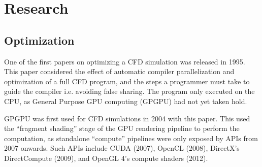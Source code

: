 
\chapter{Research}
\label{sec:Research} 






\section{Optimization}
One of the first papers on optimizing a CFD simulation was released in 1995\cite{paper:1995CfdOpt:1383209}.
This paper considered the effect of automatic compiler parallelization and optimization of a full CFD program, and the steps a programmer must take to guide the compiler i.e. avoiding false sharing.
The program only executed on the CPU, as General Purpose GPU computing (GPGPU) had not yet taken hold.

GPGPU was first used for CFD simulations in 2004 with this paper\cite{paper:2004CfdGPU:10.1109/SC.2004.26}.
This used the ``fragment shading'' stage of the GPU rendering pipeline to perform the computation, as standalone ``compute'' pipelines were only exposed by APIs from 2007 onwards.
Such APIs include CUDA (2007)\cite{tool:CUDAProgrammingV1}, OpenCL (2008)\cite{tool:OpenCL1.0PressRelease}, DirectX's DirectCompute (2009)\cite{tool:DirectComputePresentation}, and OpenGL 4's compute shaders (2012)\cite{tool:OpenGLComputeShaderExt}.

